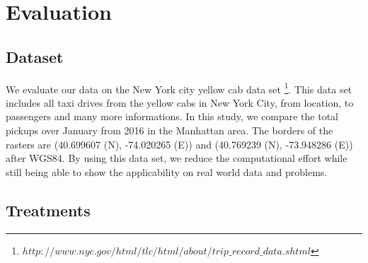 \documentclass{itatnew}
\newcommand{\SOHUP}{
  \ifmmode
    SoH^\uparrow
  \else
  \begin{math}\SOHUP\end{math}
  \fi
}
\newcommand{\SOHDOWN}{
  \ifmmode
    SoH^\downarrow
  \else
  \begin{math}\SOHDOWN\end{math}
  \fi
}
\begin{document}
\section{Evaluation}

\subsection{Dataset}

We evaluate our data on the New York city yellow cab data set 
\footnote{$http://www.nyc.gov/html/tlc/html/about/trip\_record\_data.shtml$}. 
This data set includes all taxi drives from the yellow cabs in New York City, 
from location, to passengers and many more informations. In this study, we compare the 
total pickups over January from 2016 in the Manhattan area. 
The borders of the rasters are (40.699607 \textdegree  (N), -74.020265 \textdegree  (E)) 
and (40.769239 \textdegree  (N), -73.948286 \textdegree  (E)) after WGS84.
By using this data set, we reduce the computational effort while still 
being able to show the applicability on real world data and problems.
\subsection{Treatments}

%  
%    
%    
%    

\end{document}
